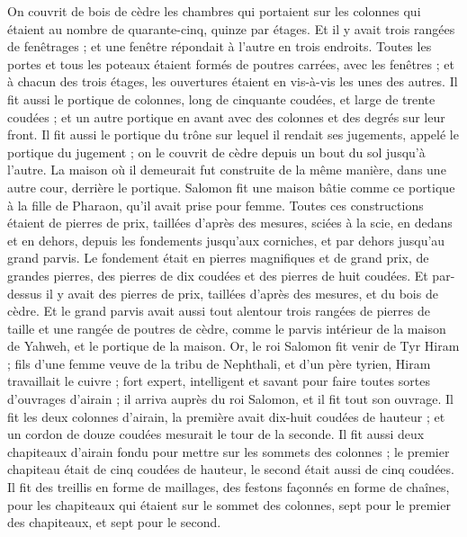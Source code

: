 \begin{multicols}{2}
On couvrit de bois de cèdre les chambres qui portaient sur les colonnes qui étaient au nombre de quarante-cinq, quinze par étages.
Et il y avait trois rangées de fenêtrages ; et une fenêtre répondait à l'autre en trois endroits.
Toutes les portes et tous les poteaux étaient formés de poutres carrées, avec les fenêtres ; et à chacun des trois étages, les ouvertures étaient en vis-à-vis les unes des autres.
Il fit aussi le portique de colonnes, long de cinquante coudées, et large de trente coudées ; et un autre portique en avant avec des colonnes et des degrés sur leur front.
Il fit aussi le portique du trône sur lequel il rendait ses jugements, appelé le portique du jugement ; on le couvrit de cèdre depuis un bout du sol jusqu'à l'autre.
La maison où il demeurait fut construite de la même manière, dans une autre cour, derrière le portique. Salomon fit une maison bâtie comme ce portique à la fille de Pharaon, qu'il avait prise pour femme.
Toutes ces constructions étaient de pierres de prix, taillées d’après des mesures, sciées à la scie, en dedans et en dehors, depuis les fondements jusqu'aux corniches, et par dehors jusqu'au grand parvis.
Le fondement était en pierres magnifiques et de grand prix, de grandes pierres, des pierres de dix coudées et des pierres de huit coudées.
Et par-dessus il y avait des pierres de prix, taillées d’après des mesures, et du bois de cèdre.
Et le grand parvis avait aussi tout alentour trois rangées de pierres de taille et une rangée de poutres de cèdre, comme le parvis intérieur de la maison de Yahweh, et le portique de la maison.
Or, le roi Salomon fit venir de Tyr Hiram ;
fils d'une femme veuve de la tribu de Nephthali, et d’un père tyrien, Hiram travaillait le cuivre ; fort expert, intelligent et savant pour faire toutes sortes d'ouvrages d'airain ; il arriva auprès du roi Salomon, et il fit tout son ouvrage.
Il fit les deux colonnes d'airain, la première avait dix-huit coudées de hauteur ; et un cordon de douze coudées mesurait le tour de la seconde.
Il fit aussi deux chapiteaux d'airain fondu pour mettre sur les sommets des colonnes ; le premier chapiteau était de cinq coudées de hauteur, le second était aussi de cinq coudées.
Il fit des treillis en forme de maillages, des festons façonnés en forme de chaînes, pour les chapiteaux qui étaient sur le sommet des colonnes, sept pour le premier des chapiteaux, et sept pour le second.

\end{multicols}
